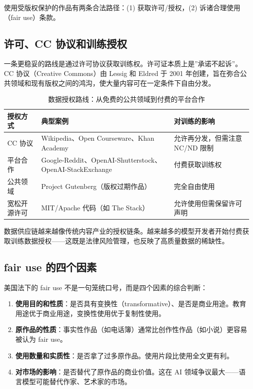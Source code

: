 使用受版权保护的作品有两条合法路径：(1) 获取许可/授权，(2) 诉诸合理使用（fair use）条款。

\subsection{许可、CC 协议和训练授权}

一条更稳妥的路线是通过许可协议获取训练权。许可证本质上是”承诺不起诉”。CC 协议（Creative Commons）由 Lessig 和 Eldred 于 2001 年创建，旨在弥合公共领域和现有版权之间的鸿沟，使大量内容可在一定条件下自由分发。

\begin{table}[H]
\centering
\begin{tabular}{p{}p{}p{}}
\toprule
\textbf{授权方式} & \textbf{典型案例} & \textbf{对训练的影响} \\
\midrule
CC 协议 & Wikipedia、Open Courseware、Khan Academy & 允许再分发，但需注意 NC/ND 限制 \\
平台合作 & Google-Reddit、OpenAI-Shutterstock、OpenAI-StackExchange & 付费获取训练权 \\
公共领域 & Project Gutenberg（版权过期作品） & 完全自由使用 \\
宽松开源许可 & MIT/Apache 代码（如 The Stack） & 允许使用但需保留许可声明 \\
\bottomrule
\end{tabular}
\caption{数据授权路线：从免费的公共领域到付费的平台合作}
\end{table}

数据供应链越来越像传统内容产业的授权链条。越来越多的模型开发者开始付费获取训练数据授权——这既是法律风险管理，也反映了高质量数据的稀缺性。

\subsection{fair use 的四个因素}

美国法下的 fair use 不是一句笼统口号，而是四个因素的综合判断：
\begin{enumerate}
    \item \textbf{使用目的和性质}：是否具有变换性（transformative）、是否是商业用途。教育用途优于商业用途，变换性使用优于复制性使用。
    \item \textbf{原作品的性质}：事实性作品（如电话簿）通常比创作性作品（如小说）更容易被认为 fair use。
    \item \textbf{使用数量和实质性}：是否拿了过多原作品。使用片段比使用全文更有利。
    \item \textbf{对市场的影响}：是否替代了原作品的商业价值。这在 AI 领域争议最大——语言模型可能替代作家、艺术家的市场。
\end{enumerate}

